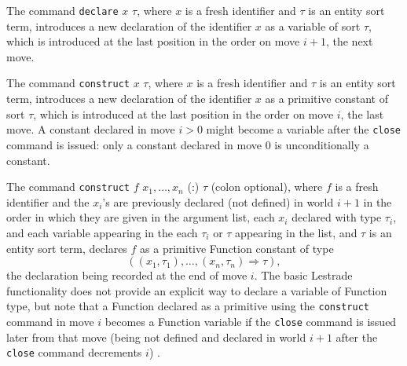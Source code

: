 \documentclass{article}
\begin{document}
The command {\tt declare} $x$ $\tau$, where $x$ is a fresh identifier and $\tau$ is an entity sort term, introduces a new declaration of the identifier $x$
as a variable of sort $\tau$, which is introduced at the last position in the order on move $i+1$, the next move.

The command {\tt construct} $x$ $\tau$, where $x$ is a fresh identifier and $\tau$ is an entity sort term, introduces a new declaration of the identifier
$x$ as a primitive constant of sort $\tau$, which is introduced at the last position in the order on move $i$, the last move.  A constant declared in move $i>0$ might become a variable after the {\tt close} command is issued:  only a constant declared in move 0 is unconditionally a constant.

The command {\tt construct} $f$ $x_1, \ldots,x_n$ (:) $\tau$ (colon optional), where $f$ is a fresh identifier and the $x_i$'s are previously declared (not defined) in world $i+1$ in the order in which they are given in the argument list, each $x_i$ declared with type $\tau_i$, and each variable appearing in the each $\tau_i$ or $\tau$ appearing in the list, and $\tau$ is an entity sort term, declares $f$ as a primitive Function constant of type
$$((x_1,\tau_1),\ldots,(x_n,\tau_n) \Rightarrow \tau),$$ the declaration being recorded at the end of move $i$.  The basic Lestrade functionality does not provide an explicit way to declare a variable of Function type, but note that a Function declared as a primitive using the {\tt construct} command in move $i$ becomes a Function variable if the {\tt close} command is issued later from that move (being not defined and declared in world $i+1$ after the {\tt close} command decrements $i$) .
\end{document}
